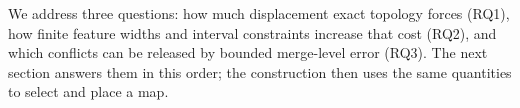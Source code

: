 We address three questions: how much displacement exact topology forces (RQ1), how finite feature widths and interval constraints increase that cost (RQ2), and which conflicts can be released by bounded merge-level error (RQ3). The next section answers them in this order; the construction then uses the same quantities to select and place a map.
